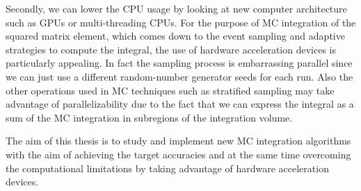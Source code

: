 \documentclass[../main/main.tex]{subfiles}
\begin{document}
Secondly, we can lower the CPU usage by looking at new computer architecture such as GPUs or multi-threading CPUs.
 For the purpose of MC integration of the squared matrix element, which comes down to the event sampling and adaptive strategies to compute
 the integral, the use of hardware acceleration devices is particularly appealing. In fact the sampling process is embarrassing parallel since we can
 just use a different random-number generator seeds for each run. Also the other operations used in MC techniques such as stratified sampling may
 take advantage of parallelizability due to the fact that we can express the integral as a sum of the MC integration in subregions of the integration volume.
 
 The aim of this thesis is to study and implement new MC integration algorithms with the aim of achieving the target accuracies and at the same time overcoming the computational limitations by taking advantage of hardware acceleration devices.

























 


 
\end{document}

